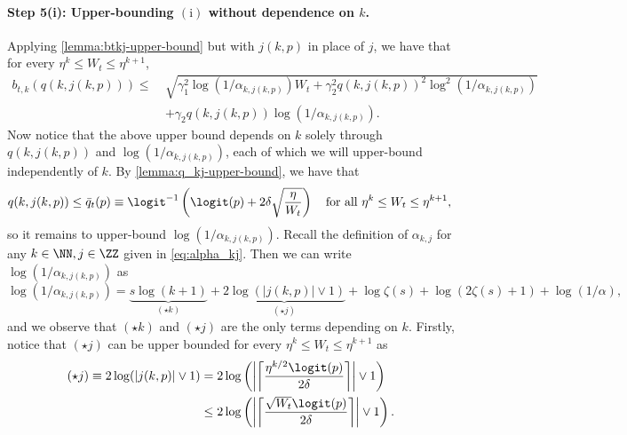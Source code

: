     \paragraph{Step 5(i): Upper-bounding $\mathrm{(i)}$ without dependence on $k$.}
        Applying \cref{lemma:btkj-upper-bound} but with $j(k, p)$ in place of $j$, we have that for every $\eta^k \leq W_t \leq \eta^{k+1}$,
    \begin{align*}
      b_{t,k}(q(k,j(k,p))) \leq \ &\sqrt{\gamma_1^2 \log(1/\alpha_{k,j(k,p)}) W_t + \gamma_2^2 q(k,j(k,p))^2 \log^2(1/\alpha_{k,j(k,p)})}\\
                                 \ &+ \gamma_2 q(k,j(k,p)) \log(1/\alpha_{k,j(k,p)}).
    \end{align*}
    Now notice that the above upper bound depends on $k$ solely through $q(k,j(k,p))$ and $\log(1/\alpha_{k,j(k,p)})$, each of which we will upper-bound independently of $k$. 
    By \cref{lemma:q_kj-upper-bound}, we have that
    \begin{equation}
      q(k,j(k,p)) \leq \bar q_t(p) \equiv \logit^{-1} \left ( \logit(p) + 2\delta \sqrt{\frac{\eta}{W_t}} \right ) ~~~\text{for all } \eta^k \leq W_t \leq \eta^{k+1},\\
    \end{equation}
    so it remains to upper-bound $\log(1/\alpha_{k,j(k,p)})$.
    Recall the definition of $\alpha_{k,j}$ for any $k \in \NN, j \in \ZZ$ given in \eqref{eq:alpha_kj}. Then we can write $\log(1/\alpha_{k,j(k,p)})$ as
    \begin{equation}\label{eq:log-1-by-alpha-kj}
      \log(1/\alpha_{k,j(k,p)}) = \underbrace{s\log(k+1)}_{(\star k)} + \underbrace{2\log(|j(k,p)| \lor 1)}_{(\star j)} + \log\zeta(s) + \log(2\zeta(s) + 1) + \log(1/\alpha),
    \end{equation}
    and we observe that $(\star k)$ and $(\star j)$ are the only terms depending on $k$. 
    Firstly, notice that $(\star j)$ can be upper bounded for every $\eta^k \leq W_t \leq \eta^{k+1}$ as
    \begin{align*}
      (\star j) \equiv 2\log(|j(k,p)| \lor 1) &= 2\log \left ( \left|\left \lceil \frac{\eta^{k/2}\logit(p)}{2\delta} \right \rceil \right| \lor 1\right ) \\
      &\leq 2\log \left ( \left |  \left \lceil \frac{\sqrt{W_t} \logit(p)}{2\delta} \right \rceil \right |  \lor 1\right ).
    \end{align*}
